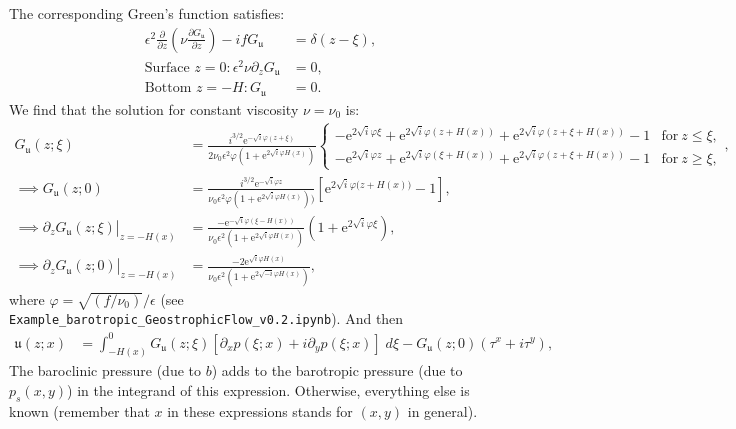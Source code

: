 \documentclass[10pt]{amsart}
\begin{document}
The corresponding Green's function satisfies:
\begin{align}
\epsilon^2 \frac{\partial}{\partial z} \left( \nu  \frac{\partial G_\mathfrak{u}}{\partial z} \right)  - i f  G_\mathfrak{u} & = \delta(z - \xi) ,  \\
\text{Surface~}z = 0:
\epsilon^2 \nu \partial_z G_\mathfrak{u} & = 0 ,
 \\
\text{Bottom~}z = -H:
G_\mathfrak{u} & = 0 .
\end{align}
We find that the solution for constant viscosity $\nu = \nu_0$ is:  
\begin{align}
 G_{ \mathfrak{u}}(z;\xi) & = 
\frac{ i^{3/2} \mathrm{e}^{- \sqrt{i} \varphi (z + \xi)} }{2  \nu_0 \epsilon^2 \varphi  \left(1 + \mathrm{e}^{2 \sqrt{i} \varphi H \left(x \right)} \right)}
\begin{cases} 
\displaystyle - \mathrm{e}^{2 \sqrt{i} \varphi \xi} + \mathrm{e}^{2 \sqrt{i} \varphi \left( z + H(x)\right)} + \mathrm{e}^{2 \sqrt{i} \varphi \left( z + \xi + H(x)\right)} - 1
 & \text{for}\: z \leq \xi , \\
\displaystyle - \mathrm{e}^{2 \sqrt{i} \varphi z} + \mathrm{e}^{2 \sqrt{i} \varphi \left( \xi + H(x)\right)} + \mathrm{e}^{2 \sqrt{i} \varphi \left( z + \xi + H(x)\right)} - 1
 & \text{for}\: z \geq \xi ,
\end{cases} , \label{eqn:FG_Gsfn} \\
\implies  G_{ \mathfrak{u}}(z;0) & = 
\frac{ i^{3/2} \mathrm{e}^{- \sqrt{i} \varphi z } }{ \nu_0 \epsilon^2 \varphi  \left(1 + \mathrm{e}^{2 \sqrt{i} \varphi H \left(x \right)} \right))}
\left[ \mathrm{e}^{2 \sqrt{i} \varphi ( z  + H{\left(x \right))}} - 1 \right] , \nonumber \\
\implies \partial_z \left. G_{ \mathfrak{u}}(z;\xi) \right|_{z = -H(x)} & = 
\frac{- \mathrm{e}^{-\sqrt{i} \varphi (\xi - H(x))  } }{ \nu_0 \epsilon^2 \left(1 + \mathrm{e}^{2 \sqrt{i} \varphi H \left(x \right)} \right)}
\left( 1 + \mathrm{e}^{2 \sqrt{i} \varphi \xi}\right) , \label{eqn:FG_Gsfn_bottom_deriv} \\
\implies \partial_z \left. G_{ \mathfrak{u}}(z;0) \right|_{z = -H(x)} & = 
\frac{- 2 \mathrm{e}^{\sqrt{i} \varphi H(x)  } }{ \nu_0 \epsilon^2 \left(1 + \mathrm{e}^{2 \sqrt{-i} \varphi H \left(x \right)} \right)}
 , \label{eqn:FG_Gsfn_bottom_deriv_top}
\end{align}
where $\varphi = \sqrt{\left( f / \nu_0 \right) } / \epsilon$ (see \texttt{Example\_barotropic\_GeostrophicFlow\_v0.2.ipynb}).
And then 
\begin{align}
\mathfrak{u} (z;x) & = \int_{-H(x)}^{0} G_{ \mathfrak{u}} (z; \xi) \left[ \partial_x p( \xi; x) + i \partial_y p( \xi; x) \right] \; d \xi 
 -   G_{\mathfrak{u}} (z; 0)  \left( \tau^x + i \tau^y \right)  ,
\end{align}
The baroclinic pressure (due to $b$) adds to the barotropic pressure (due to $p_s(x,y)$) in the integrand of this expression. 
Otherwise, everything else is known (remember that $x$ in these expressions stands for $(x,y)$ in general).
\end{document}
